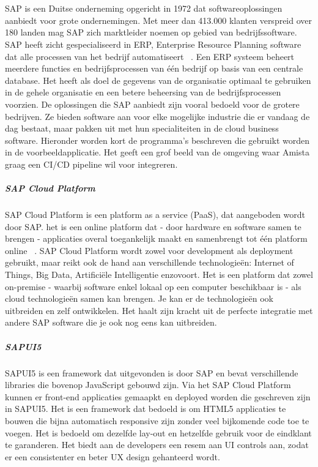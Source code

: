 \chapter{}
\label{ch:sap}
SAP is een Duitse onderneming opgericht in 1972 dat softwareoplossingen aanbiedt voor grote ondernemingen. Met meer dan 413.000 klanten verspreid over 180 landen mag SAP zich marktleider noemen op gebied van bedrijfssoftware.
SAP heeft zicht gespecialiseerd in ERP, Enterprise Resource Planning software dat alle processen van het bedrijf automatiseert ~\autocite{SAPERP2019}. Een ERP systeem beheert meerdere functies en bedrijfsprocessen van één bedrijf op basis van een centrale database. Het heeft als doel de gegevens van de organisatie optimaal te gebruiken in de gehele organisatie en een betere beheersing van de bedrijfsprocessen voorzien.
De oplossingen die SAP aanbiedt zijn vooral bedoeld voor de grotere bedrijven. Ze bieden software aan voor elke mogelijke industrie die er vandaag de dag bestaat, maar pakken uit met hun specialiteiten in de cloud business software.
Hieronder worden kort de programma's beschreven die gebruikt worden in de voorbeeldapplicatie. Het geeft een grof beeld van de omgeving waar Amista graag een CI/CD pipeline wil voor integreren.

    \paragraph{SAP Cloud Platform}
    SAP Cloud Platform is een platform as a service (PaaS), dat aangeboden wordt door SAP. het is een online platform dat - door hardware en software samen te brengen - applicaties overal toegankelijk maakt en samenbrengt tot één platform online ~\autocite{SAPSE2018}.
    SAP Cloud Platform wordt zowel voor development als deployment gebruikt, maar reikt ook de hand aan verschillende technologieën: Internet of Things, Big Data, Artificiële Intelligentie enzovoort. Het is een platform dat zowel on-premise - waarbij software enkel lokaal op een computer beschikbaar is - als cloud technologieën samen kan brengen. Je kan er de technologieën ook uitbreiden en zelf ontwikkelen. Het haalt zijn kracht uit de perfecte integratie met andere SAP software die je ook nog eens kan uitbreiden.
    
    \paragraph{SAPUI5}
    SAPUI5 is een framework dat uitgevonden is door SAP en bevat verschillende libraries die bovenop JavaScript gebouwd zijn. Via het SAP Cloud Platform kunnen er front-end applicaties gemaapkt en deployed worden die geschreven zijn in SAPUI5. Het is een framework dat bedoeld is om HTML5 applicaties te bouwen die bijna automatisch responsive zijn zonder veel bijkomende code toe te voegen.
    Het is bedoeld om dezelfde lay-out en hetzelfde gebruik voor de eindklant te garanderen. Het biedt aan de developers een resem aan UI controls aan, zodat er een consistenter en beter UX design gehanteerd wordt.~\autocite{SAPSEa} 
    
